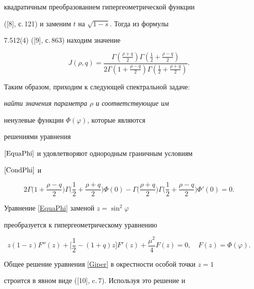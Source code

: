 квадратичным преобразованием гипергеометрической функции


([8], с.\,121) и заменим $t$ на $\sqrt{1-s}$. Тогда из формулы


7.512(4) ([9], с.\,863) находим значение


$$


J(\rho,q)= \frac{


\Gamma(\frac{\rho+q}{2})\Gamma(\frac{1}{2}+\frac{\rho-q}{2})}


{2\Gamma(1+\frac{\rho-q}{2})\Gamma(\frac{1}{2}+\frac{\rho+q}{2})}.


$$





Таким образом, приходим к следующей спектральной задаче:


{\it найти значения параметра $\rho$ и соответствующие им


ненулевые функции $\Phi(\varphi)$, которые являются


решениями уравнения


$\eqref{EquaPhi}$ и удовлетворяют однородным граничным условиям


$\eqref{CondPhi}$ и}


\begin{equation}\label{PCond1}


2\Gamma\bigg(1+\frac{\rho-q}{2}\bigg)\Gamma\bigg(\frac{1}{2}+


\frac{\rho+q}{2}\bigg)\Phi(0)


-\Gamma\bigg(\frac{\rho+q}{2}\bigg)\Gamma\bigg(


\frac{1}{2}+\frac{\rho-q}{2}\bigg)\Phi'(0)=0.


\end{equation}





Уравнение \eqref{EquaPhi} заменой $z=\sin^2\varphi$


преобразуется к гипергеометрическому уравнению


\begin{equation}\label{Giper}


z(1-z)F''(z) + \bigg[\frac{1}{2}-(1+q)z\bigg]F'(z) +\frac{\mu^2}{4}F(z)=0,


\quad F(z)=\Phi(\varphi).


\end{equation}


Общее решение уравнения \eqref{Giper} в окрестности особой точки $z=1$


строится в явном виде ([10], c.\,7). Используя это решение и


